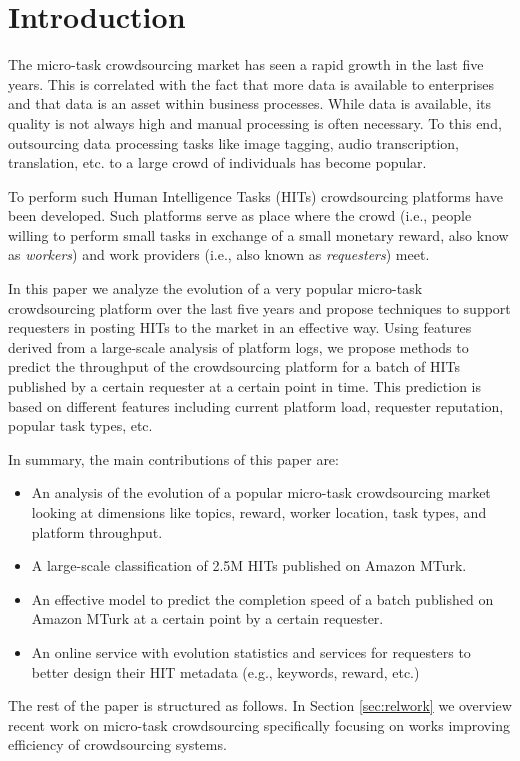 \section{Introduction}\label{sec:intro}
The micro-task crowdsourcing market has seen a rapid growth in the last five years. This is correlated with the fact that more data is available to enterprises and that data is an asset within business processes. While data is available, its quality is not always high and manual processing is often necessary. To this end, outsourcing  data processing tasks  like image tagging, audio transcription, translation, etc. to a large crowd of individuals has become popular.

To perform such Human Intelligence Tasks (HITs) crowdsourcing platforms have been developed. Such platforms serve as place where the crowd (i.e., people willing to perform small tasks in exchange of a small monetary reward, also know as \emph{workers}) and work providers (i.e., also known as \emph{requesters}) meet. 

%
In this paper we analyze the evolution of a very popular micro-task crowdsourcing platform over the last five years and propose techniques to support requesters in posting HITs to the market in an effective way. Using features derived from a large-scale analysis of platform logs, we propose methods to predict the throughput of the crowdsourcing platform for a batch of HITs published by a certain requester at a certain point in time. This prediction is based on different features including current platform load, requester reputation, popular task types, etc.



In summary, the main contributions of this paper are:
\begin{itemize}

	\item An analysis of the evolution of a popular micro-task crowdsourcing market looking at dimensions like topics, reward, worker location, task types, and platform throughput.

	\item A large-scale classification of 2.5M HITs published on Amazon MTurk.

	\item An effective model to predict the completion speed of a batch published on Amazon MTurk at a certain point by a certain requester.

	\item An online service with evolution statistics and services for requesters to better design their HIT metadata (e.g., keywords, reward, etc.)

\end{itemize}


The rest of the paper is structured as follows.
In Section \ref{sec:relwork} we overview recent work on micro-task crowdsourcing specifically focusing on works improving efficiency of crowdsourcing systems.